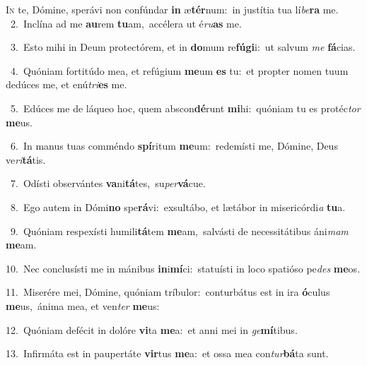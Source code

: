 \lettrine{\initial\textcolor{\initialcolor}{I}}{n} te, Dómine, sperávi non confúndar \textbf{in} æ\-\textbf{tér}\-num:~\star in justítia tua lí\-\textit{be}\-\textbf{ra} me.\\
{\numbfont\textcolor{\numbcolor}{~2.}}~Inclína ad me \textbf{au}\-rem \textbf{tu}\-am,~\star accélera ut é\-\textit{ru}\-\textbf{as} me.\par
{\numbfont\textcolor{\numbcolor}{~3.}}~Esto mihi in Deum protectórem, et in \textbf{do}\-mum re\-\textbf{fú}\-\textbf{gi}i:~\star ut salvum \textit{me} \textbf{fá}\-cias.\par
{\numbfont\textcolor{\numbcolor}{~4.}}~Quóniam fortitúdo mea, et refúgium \textbf{me}\-um \textbf{es} tu:~\star et propter nomen tuum dedúces me, et enú\-\textit{tri}\-\textbf{es} me.\par
{\numbfont\textcolor{\numbcolor}{~5.}}~Edúces me de láqueo hoc, quem abscon\-\textbf{dé}\-runt \textbf{mi}\-hi:~\star quóniam tu es protéc\textit{tor} \textbf{me}\-us.\par
{\numbfont\textcolor{\numbcolor}{~6.}}~In manus tuas comméndo \textbf{spí}\-ritum \textbf{me}\-um:~\star redemísti me, Dómine, Deus ve\-\textit{ri}\-\textbf{tá}tis.\par
{\numbfont\textcolor{\numbcolor}{~7.}}~Odísti observántes \textbf{va}\-ni\-\textbf{tá}\-tes,~\star su\-\textit{per}\-\textbf{vá}cue.\par
{\numbfont\textcolor{\numbcolor}{~8.}}~Ego autem in Dómi\textbf{no} spe\-\textbf{rá}\-vi:~\star exsultábo, et lætábor in misericórdi\textit{a} \textbf{tu}\-a.\par
{\numbfont\textcolor{\numbcolor}{~9.}}~Quóniam respexísti humili\-\textbf{tá}\-tem \textbf{me}\-am,~\star salvásti de necessitátibus áni\textit{mam} \textbf{me}\-am.\par
{\numbfont\textcolor{\numbcolor}{10.}}~Nec conclusísti me in mánibus \textbf{in}\-i\-\textbf{mí}\-ci:~\star statuísti in loco spatióso pe\textit{des} \textbf{me}\-os.\par
{\numbfont\textcolor{\numbcolor}{11.}}~Miserére mei, Dómine, quóniam tríbulor:~\dagger conturbátus est in ira \textbf{ó}\-culus \textbf{me}\-us,~\star ánima mea, et ven\textit{ter} \textbf{me}\-us:\par
{\numbfont\textcolor{\numbcolor}{12.}}~Quóniam defécit in dolóre \textbf{vi}\-ta \textbf{me}\-a:~\star et anni mei in \textit{ge}\-\textbf{mí}tibus.\par
{\numbfont\textcolor{\numbcolor}{13.}}~Infirmáta est in paupertáte \textbf{vir}\-tus \textbf{me}\-a:~\star et ossa mea con\-\textit{tur}\-\textbf{bá}ta sunt.\par
